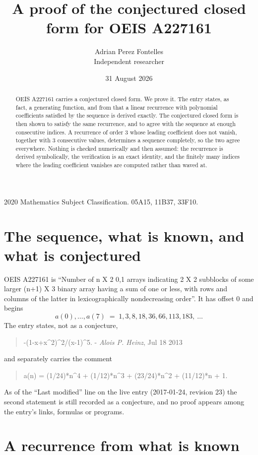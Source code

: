 \documentclass[11pt,a4paper]{article}
\title{A proof of the conjectured closed form for OEIS A227161}
\author{Adrian Perez Fontelles\\ \small Independent researcher}
\date{31 August 2026}
\theoremstyle{plain}
\theoremstyle{definition}
\begin{document}
\maketitle

\begin{abstract}
OEIS A227161 carries a conjectured closed form. We prove it. The entry states, as fact,
a generating function, and from that a linear recurrence with polynomial coefficients satisfied by
the sequence is derived exactly. The conjectured closed form is then shown to satisfy the
same recurrence, and to agree with the sequence at enough consecutive indices. A recurrence
of order $3$ whose leading coefficient does not vanish, together with $3$
consecutive values, determines a sequence completely, so the two agree everywhere. Nothing
is checked numerically and then assumed: the recurrence is derived symbolically, the
verification is an exact identity, and the finitely many indices where the leading
coefficient vanishes are computed rather than waved at.
\end{abstract}

\noindent\small 2020 Mathematics Subject Classification. 05A15, 11B37, 33F10.\normalsize

\section{The sequence, what is known, and what is conjectured}

OEIS A227161 is ``Number of n X 2 0,1 arrays indicating 2 X 2 subblocks of some larger (n+1) X 3 binary array having a sum of one or less, with rows and columns of the latter in lexicographically nondecreasing order''. It has offset $0$ and begins
\[
a(0),\dots,a(7)\;=\;1, 3, 8, 18, 36, 66, 113, 183,\ \dots
\]
The entry states, not as a conjecture,
\begin{quote}\small
-(1-x+x\textasciicircum{}2)\textasciicircum{}2/(x-1)\textasciicircum{}5. - \emph{Alois P. Heinz}, Jul 18 2013
\end{quote}
and separately carries the comment
\begin{quote}\small
a(n) = (1/24)*n\textasciicircum{}4 + (1/12)*n\textasciicircum{}3 + (23/24)*n\textasciicircum{}2 + (11/12)*n + 1.
\end{quote}
As of the ``Last modified'' line on the live entry (2017-01-24, revision 23) the second
statement is still recorded as a conjecture, and no proof appears among the entry's links,
formulas or programs.

\section{A recurrence from what is known}
\end{document}
